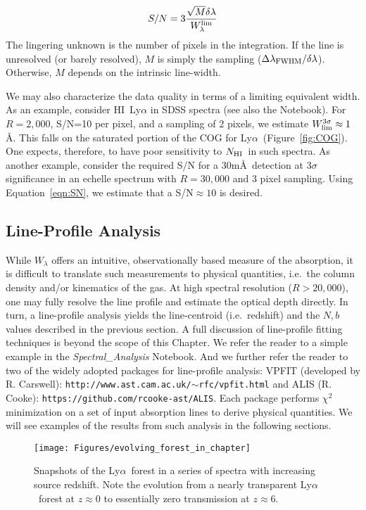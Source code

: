 \documentclass[graybox]{svmult}
\newcommand{\HI}{H{\sc I}}
\def\lya{Ly$\alpha$}
\newcommand{\mnhi}{N_{\rm HI}}
\newcommand{\nhi}{$\mnhi$}
\begin{document}
\begin{equation}
S/N = 3 \frac{\sqrt{M} \delta\lambda}{W_\lambda^{\rm lim}}
\label{eqn:SN}
\end{equation}
The lingering unknown is the number of pixels in the
integration.
If the line is unresolved (or barely resolved), 
$M$ is simply the sampling ($\Delta\lambda_{\rm FWHM} / \delta\lambda$).
Otherwise, $M$ depends on the intrinsic line-width. 

We may also characterize the data quality in terms of a
limiting equivalent width.  As an example, consider 
\HI\ Ly$\alpha$ in SDSS spectra (see also the Notebook).
For $R=2,000$, S/N=10 per pixel, and a sampling of 2 pixels,
we estimate  $W_{\rm lim}^{3\sigma} \approx 1$\AA.
This falls on the saturated portion of the COG for \lya\
(Figure~\ref{fig:COG}).  One expects, therefore,
to have  poor sensitivity to \nhi\ in such spectra. 
As another example, consider the required S/N for a 
30m\AA\ detection at $3\sigma$ significance in an echelle
spectrum with $R=30,000$ and 3 pixel sampling.  Using
Equation~\ref{eqn:SN}, we estimate that a 
S/N$\approx 10$ is desired.

\subsection{Line-Profile Analysis}

While $W_\lambda$ offers an intuitive, observationally based
measure of the absorption, it is difficult to translate
such measurements to physical quantities, i.e.\ the column
density and/or kinematics of the gas.  At high spectral
resolution ($R > 20,000$), one may fully resolve
the line profile and estimate the optical depth directly.
In turn, a line-profile analysis yields the line-centroid
(i.e.\ redshift) and the $N,b$ values described in the
previous section.
A full discussion of line-profile fitting techniques is
beyond the scope of this Chapter.  We refer the reader
to a simple example in the {\it Spectral\_Analysis} Notebook.
And we further refer the reader to two of the widely adopted
packages for line-profile analysis:
VPFIT (developed by R. Carswell):  {\tt http://www.ast.cam.ac.uk/$\sim$rfc/vpfit.html}
and ALIS (R. Cooke): {\tt https://github.com/rcooke-ast/ALIS}.
Each package performs $\chi^2$ minimization on a set of
input absorption lines to derive physical quantities.
We will see examples of the results from such analysis in the
following sections.


\begin{figure}[ht]
\sidecaption
\texttt{[image: Figures/evolving\_forest\_in\_chapter]}
%
%
\caption{Snapshots of the \lya\ forest in a series of spectra
with increasing source redshift.  Note the evolution from a nearly
transparent \lya\ forest at $z \approx 0$ to essentially 
zero transmission at $z \approx 6$.
}
\label{fig:lyf_z}       %
\end{figure}
\end{document}
